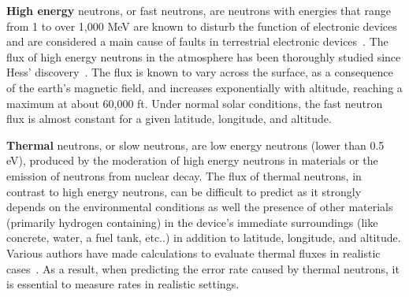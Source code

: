 \textbf{High energy} neutrons, or fast neutrons, are neutrons with energies that range from 1 to over 1,000 MeV are known to disturb the function of electronic devices and are considered a main cause of faults in terrestrial electronic devices~\cite{Baumann2005,ziegler2004ser}. %
The flux of high energy neutrons in the atmosphere has been thoroughly studied since Hess' discovery~\cite{Hess,Ziegler1996}. The flux is known to vary across the surface, as a consequence of the earth's magnetic field, and increases exponentially with altitude, reaching a maximum at about 60,000 ft. Under normal solar conditions, the fast neutron flux is almost constant for a given latitude, longitude, and altitude. 

\textbf{Thermal} neutrons, or slow neutrons, are low energy neutrons (lower than 0.5 eV), produced by the moderation of high energy neutrons in materials or the emission of neutrons from nuclear decay. 
%
The flux of thermal neutrons, in contrast to high energy neutrons, can be difficult to predict as it strongly depends on the environmental conditions as well the presence of other materials (primarily hydrogen containing) in the device's immediate surroundings (like concrete, water, a fuel tank, etc..) in addition to latitude, longitude, and altitude. Various authors have made calculations to evaluate thermal fluxes in realistic cases~\cite{ziegler2003, hands2011single, baumannsoft, sheu2003cosmic}. As a result, when predicting the error rate caused by thermal neutrons, it is essential to measure rates in realistic settings. 

